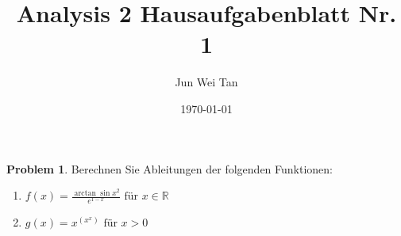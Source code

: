 \documentclass[prb,12pt]{revtex4-2}
\theoremstyle{definition}
\newtheorem{Problem}{Problem}
\theoremstyle{definition}
\newenvironment{parts}{\begin{enumerate}[label=(\alph*)]}{\end{enumerate}}
\newcommand{\R}{\mathbb{R}}
\begin{document}
	\title{Analysis 2 Hausaufgabenblatt Nr. 1}
	\author{Jun Wei Tan}
	\date{\today}
	\maketitle
\begin{Problem}
Berechnen Sie Ableitungen der folgenden Funktionen:
\begin{parts}
	\item $f(x)=\frac{\arctan\sin x^2}{e^{1-x}}\text{ f\"{u}r }x\in \R$ 
	\item $g(x)=x^{(x^x)}\text{ f\"{u}r }x>0$
\end{parts}
\end{Problem}
\end{document}
